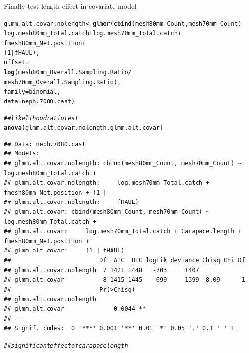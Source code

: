 \documentclass[12pt]{article}\usepackage[]{graphicx}\usepackage[]{color}
\makeatletter
\newcommand{\hlnum}[1]{\textcolor[rgb]{0.686,0.059,0.569}{#1}}%
\newcommand{\hlcom}[1]{\textcolor[rgb]{0.678,0.584,0.686}{\textit{#1}}}%
\newcommand{\hlopt}[1]{\textcolor[rgb]{0,0,0}{#1}}%
\newcommand{\hlstd}[1]{\textcolor[rgb]{0.345,0.345,0.345}{#1}}%
\newcommand{\hlkwb}[1]{\textcolor[rgb]{0.69,0.353,0.396}{#1}}%
\newcommand{\hlkwc}[1]{\textcolor[rgb]{0.333,0.667,0.333}{#1}}%
\newcommand{\hlkwd}[1]{\textcolor[rgb]{0.737,0.353,0.396}{\textbf{#1}}}%
\newenvironment{kframe}{%
 \def\at@end@of@kframe{}%
 \ifinner\ifhmode%
  \def\at@end@of@kframe{\end{minipage}}%
  \begin{minipage}{\columnwidth}%
 \fi\fi%
 \def\FrameCommand##1{\hskip\@totalleftmargin \hskip-\fboxsep
 \colorbox{shadecolor}{##1}\hskip-\fboxsep
     \hskip-\linewidth \hskip-\@totalleftmargin \hskip\columnwidth}%
 \MakeFramed {\advance\hsize-\width
   \@totalleftmargin\z@ \linewidth\hsize
   \@setminipage}}%
 {\par\unskip\endMakeFramed%
 \at@end@of@kframe}
\newenvironment{knitrout}{}{} %
\makeatother
\begin{document}
Finally test length effect in covariate model
\begin{knitrout}\footnotesize
{}\color{fgcolor}\begin{kframe}
\begin{alltt}
\hlstd{glmm.alt.covar.nolength} \hlkwb{<-} \hlkwd{glmer}\hlstd{(}\hlkwd{cbind}\hlstd{(mesh80mm_Count, mesh70mm_Count)} \hlopt{~}
                        \hlstd{log.mesh80mm_Total.catch} \hlopt{+} \hlstd{log.mesh70mm_Total.catch} \hlopt{+}
                        \hlstd{fmesh80mm_Net.position} \hlopt{+}
                        \hlstd{(}\hlnum{1} \hlopt{|} \hlstd{fHAUL),}
                        \hlkwc{offset} \hlstd{=}
                        \hlkwd{log}\hlstd{(mesh80mm_Overall.Sampling.Ratio} \hlopt{/}
                            \hlstd{mesh70mm_Overall.Sampling.Ratio),}
                        \hlkwc{family} \hlstd{= binomial,}
                        \hlkwc{data} \hlstd{= neph.7080.cast)}

\hlcom{## likelihood ratio test}
\hlkwd{anova}\hlstd{(glmm.alt.covar.nolength, glmm.alt.covar)}
\end{alltt}
\begin{verbatim}
## Data: neph.7080.cast
## Models:
## glmm.alt.covar.nolength: cbind(mesh80mm_Count, mesh70mm_Count) ~ log.mesh80mm_Total.catch + 
## glmm.alt.covar.nolength:     log.mesh70mm_Total.catch + fmesh80mm_Net.position + (1 | 
## glmm.alt.covar.nolength:     fHAUL)
## glmm.alt.covar: cbind(mesh80mm_Count, mesh70mm_Count) ~ log.mesh80mm_Total.catch + 
## glmm.alt.covar:     log.mesh70mm_Total.catch + Carapace.length + fmesh80mm_Net.position + 
## glmm.alt.covar:     (1 | fHAUL)
##                         Df  AIC  BIC logLik deviance Chisq Chi Df
## glmm.alt.covar.nolength  7 1421 1448   -703     1407             
## glmm.alt.covar           8 1415 1445   -699     1399  8.09      1
##                         Pr(>Chisq)   
## glmm.alt.covar.nolength              
## glmm.alt.covar              0.0044 **
## ---
## Signif. codes:  0 '***' 0.001 '**' 0.01 '*' 0.05 '.' 0.1 ' ' 1
\end{verbatim}
\begin{alltt}
\hlcom{## significant effect of carapace length}
\end{alltt}
\end{kframe}
\end{knitrout}



\end{document}
